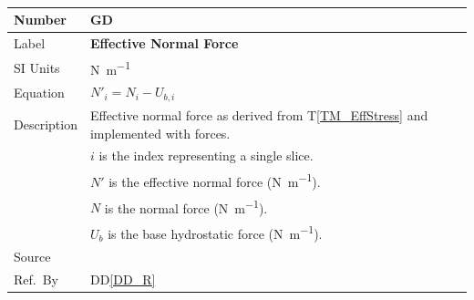 \documentclass[12pt]{article}
\newcommand{\colAwidth}{0.13\textwidth}
\newcommand{\colBwidth}{0.82\textwidth}
\newcommand{\tref}[1]{T\ref{#1}}
\renewcommand{\arraystretch}{1}
\newcommand{\ddref}[1]{DD\ref{#1}}
\newcounter{defnum} %
\begin{document}
~\newline

\noindent
\begin{minipage}{\textwidth}
	\renewcommand*{\arraystretch}{1.5}
	\begin{tabular}{| p{\colAwidth} | p{\colBwidth}|}
		
		\hline \rowcolor[gray]{0.9} Number&
		GD{defnum}\thedefnum \label{GD_EffNormal}\\
		
		\hline Label&\bf Effective Normal Force\\
		\hline SI Units & \si{\newton\per\meter}\\
		
		\hline Equation & \( N'_{i} = N_{i} - U_{b,i} \) \\
	
	\hline Description & Effective normal force as derived from 
	\tref{TM_EffStress} and implemented with forces. 
	\\
	&$i$ is the index representing a single slice.\\
	&$N'$ is the effective normal force (\si{\newton\per\meter}).\\
	&$N$ is the normal force (\si{\newton\per\meter}).\\
	&$U_b$ is the base hydrostatic force (\si{\newton\per\meter}).\\
	
	\hline Source & \cite{ZhuEtAl2005}\\
	
	\hline Ref.\ By & \ddref{DD_R} \\
	
	\hline
\end{tabular}
\end{minipage}\\

~\newline
\end{document}
